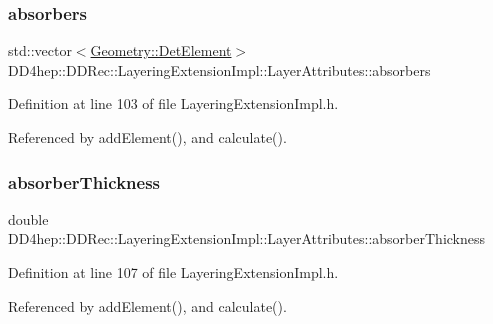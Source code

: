 \subsubsection{\texorpdfstring{absorbers}{absorbers}}
{\footnotesize\ttfamily std\+::vector$<$\hyperlink{class_d_d4hep_1_1_geometry_1_1_det_element}{Geometry\+::\+Det\+Element}$>$ D\+D4hep\+::\+D\+D\+Rec\+::\+Layering\+Extension\+Impl\+::\+Layer\+Attributes\+::absorbers}



Definition at line 103 of file Layering\+Extension\+Impl.\+h.



Referenced by add\+Element(), and calculate().

\hypertarget{struct_d_d4hep_1_1_d_d_rec_1_1_layering_extension_impl_1_1_layer_attributes_a82e4964fda149e1cf07f18048b13ac64}{}\label{struct_d_d4hep_1_1_d_d_rec_1_1_layering_extension_impl_1_1_layer_attributes_a82e4964fda149e1cf07f18048b13ac64} 
\subsubsection{\texorpdfstring{absorber\+Thickness}{absorberThickness}}
{\footnotesize\ttfamily double D\+D4hep\+::\+D\+D\+Rec\+::\+Layering\+Extension\+Impl\+::\+Layer\+Attributes\+::absorber\+Thickness}



Definition at line 107 of file Layering\+Extension\+Impl.\+h.



Referenced by add\+Element(), and calculate().

\hypertarget{struct_d_d4hep_1_1_d_d_rec_1_1_layering_extension_impl_1_1_layer_attributes_a8be7b3707f08f24e5738568783a67f7e}{}\label{struct_d_d4hep_1_1_d_d_rec_1_1_layering_extension_impl_1_1_layer_attributes_a8be7b3707f08f24e5738568783a67f7e} 
